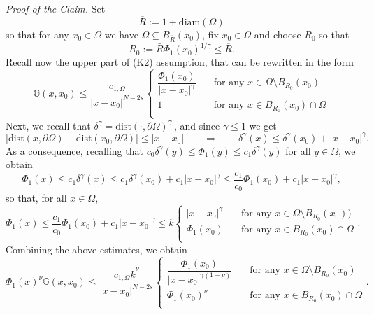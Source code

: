 \documentclass[11pt]{article}
\numberwithin{equation}{section}
\newcommand{\p}{{\delta^\gamma}} %
\newcommand{\K}{{\mathbb G}}
\def\dist{\mathrm{dist}} %
\def\diam{\mathrm{diam}} %
\begin{document}
\noindent\textit{Proof of the Claim. }Set
$$
\overline{R}:=1+\diam(\Omega)
$$
so that for any $x_0\in\Omega$ we have $\Omega\subseteq B_{\overline{R}}(x_0)$,
fix $x_0\in \Omega$ and choose $R_0$ so that
\[
R_0:=\bar R \Phi_1(x_0)^{1/\gamma}\le \overline{R}.
\]
Recall now the upper part of (K2) assumption, that can be rewritten in the  form
\begin{equation}\label{Step.1.1.Lem.Green.2}
\K(x,x_0)\le
\frac{c_{1,\Omega}}{|x-x_0|^{N-2s}}%
\left\{\begin{array}{cl}
\dfrac{\Phi_1(x_0)}{|x-x_0|^{\gamma}} &\quad\mbox{for any }x\in \Omega\setminus B_{R_0}(x_0)\\
1&\quad\mbox{for any }x\in B_{R_0}(x_0)\cap \Omega\\
\end{array}\right.
\end{equation}
Next, we recall that $\p=\dist(\cdot,\partial\Omega)^\gamma$\,, and since  $\gamma \leq 1$ we get
\[
|\dist(x,\partial\Omega)-\dist(x_0,\partial\Omega)|\le |x-x_0|\qquad\Longrightarrow\qquad  \p(x)\le\p(x_0)+ |x-x_0|^\gamma.
\]
As a consequence, recalling that $c_0\p(y)\le \Phi_1(y)\le c_1\p(y)$ for all $y\in \overline{\Omega}$, we obtain
\[
\Phi_1(x)\le c_1\p(x)\le c_1\p(x_0)+c_1 |x-x_0|^\gamma\le \frac{c_1}{c_0}\Phi_1(x_0)+c_1 |x-x_0|^\gamma,
\]
so that, for all $x\in\Omega$,
\begin{equation}\label{Step.1.2.Lem.Green.2}
\Phi_1(x)\le \frac{c_1}{c_0}\Phi_1(x_0)+c_1|x-x_0|^\gamma \le \overline{k}\left\{\begin{array}{cl}
|x-x_0|^\gamma  &\quad\mbox{for any }x\in \Omega\setminus B_{R_0}(x_0))\\
\Phi_1(x_0)&\quad\mbox{for any }x\in B_{R_0}(x_0)\cap \Omega\\
\end{array}\right..
\end{equation}
Combining the above estimates, we obtain
\begin{equation}\label{Step.1.3.Lem.Green.2}
\Phi_1(x)^{\nu} \K(x,x_0)\le
\frac{c_{1,\Omega}\overline{k}^{\nu}}{|x-x_0|^{N-2s}}
\left\{\begin{array}{cl}
\dfrac{\Phi_1(x_0)}{|x-x_0|^{\gamma(1-\nu)}} &\quad\mbox{for any }x\in \Omega\setminus B_{R_0}(x_0)\\
\Phi_1(x_0)^{\nu}&\quad\mbox{for any }x\in B_{R_0}(x_0)\cap \Omega\\
\end{array}\right..
\end{equation}
\end{document}
